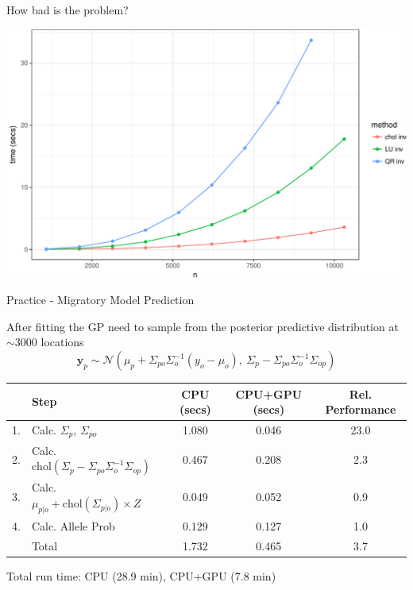 \documentclass[11pt,ignorenonframetext,]{beamer}
\begin{document}
\begin{frame}{How bad is the problem?}

\includegraphics{Lec22_files/figure-beamer/unnamed-chunk-1-1.pdf}

\end{frame}

\begin{frame}{Practice - Migratory Model Prediction}

After fitting the GP need to sample from the posterior predictive
distribution at \(\sim3000\) locations
\[ \bm{y}_{p} \sim \mathcal{N}\left(\mu_p + \Sigma_{po} \Sigma_o^{-1}(y_o - \mu_o) ,~ \Sigma_p - \Sigma_{po} \Sigma_{o}^{-1} \Sigma_{op}\right) \]

\pause

\scriptsize  

\begin{center}
\renewcommand*{\arraystretch}{1.5}
\begin{tabular}{rl|c|c|c}
& Step                                    & CPU (secs)  & CPU+GPU (secs)  & Rel. Performance \\
\hline
1. & Calc. $\Sigma_p$, $\Sigma_{po}$      & 1.080       & 0.046           & 23.0 \\
2. & Calc. $\text{chol}(\Sigma_p - \Sigma_{po} \Sigma_{o}^{-1} \Sigma_{op})$         
                                          & 0.467       & 0.208           & 2.3 \\
3. & Calc. $\mu_{p|o} + \text{chol}(\Sigma_{p|o}) \times Z$
                                          & 0.049       & 0.052           & 0.9 \\
4. & Calc. Allele Prob                    & 0.129       & 0.127           & 1.0 \\
\hline 
   & Total                                & 1.732       & 0.465           & 3.7 \\
\end{tabular}
\end{center}

\vspace{3mm}

\normalsize
Total run time: CPU (28.9 min), CPU+GPU (7.8 min)

\end{frame}
\end{document}
